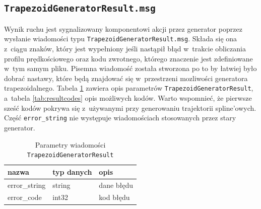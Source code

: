 \documentclass[a4paper, 12pt]{article}
\begin{document}
	\subsection{\texttt{TrapezoidGeneratorResult.msg}}
	\label{sec:msgsresult}
	Wynik ruchu jest sygnalizowany komponentowi akcji przez generator poprzez wysłanie wiadomości typu \texttt{TrapezoidGeneratorResult.msg}. Składa się ona z~ciągu znaków, który jest wypełniony jeśli nastąpił błąd w~trakcie obliczania profilu prędkościowego oraz kodu zwrotnego, którego znaczenie jest zdefiniowane w~tym samym pliku. Pisemna wiadomość została stworzona po to by łatwiej było dobrać nastawy, które będą znajdować się w~przestrzeni mozliwości generatora trapezoidalnego. Tabela \ref{tab:resultparams} zawiera opis parametrów \texttt{TrapezoidGeneratorResult}, a~tabela \ref{tab:resultcodes} opis możliwych kodów. Warto wspomnieć, że pierwsze sześć kodów pokrywa się z~używanymi przy generowaniu trajektorii spline'owych. Część \texttt{error\_string} nie występuje wiadomościach stosowanych przez stary generator.
	
	\begin{table}[H]
	\label{tab:resultparams}
	\centering
	\begin{tabular}{|m{12em}|m{12em}|m{13em}|}
	\hline
	nazwa & typ danych & opis\\
	\hline
	\hline
	error\_string & string & dane błędu \\  
	\hline
	error\_code & int32 & kod błędu\\
	\hline
	\end{tabular}
	\caption{Parametry wiadomości \texttt{TrapezoidGeneratorResult}}
	\end{table}	
	
\end{document}
